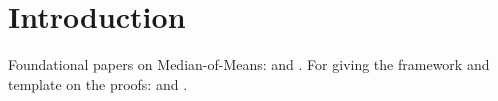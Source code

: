 \section{Introduction}

Foundational papers on Median-of-Means: \cite{nemirovskij1983problem} and \cite{jerrum1986random}. For giving the framework and template on the proofs: \cite{devroye2016sub} and \cite{lugosi2019mean}.